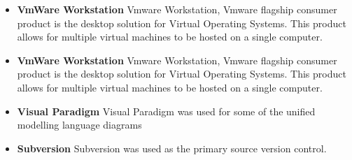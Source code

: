 {\begin{itemize}
			\item \textbf{VmWare Workstation}	
				\newline								
				Vmware Workstation, Vmware flagship consumer product is the desktop solution for Virtual Operating Systems.
				This product allows for multiple virtual machines to be hosted on a single computer.
				
			\item \textbf{VmWare Workstation}	
				\newline								
				Vmware Workstation, Vmware flagship consumer product is the desktop solution for Virtual Operating Systems.
				This product allows for multiple virtual machines to be hosted on a single computer.
				
			\item \textbf{Visual Paradigm}	
				\newline								
				Visual Paradigm was used for some of the unified modelling language diagrams
				
			\item \textbf{Subversion}	
				\newline								
				Subversion was used as the primary source version control.	

		\end{itemize}
		
	}

\newpage